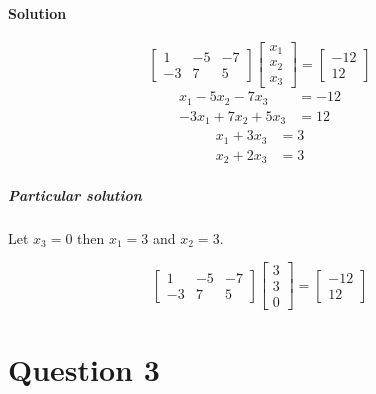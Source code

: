 \documentclass{article}
\begin{document}
\begin{enumerate}[label=(\alph*)]
                    \paragraph{Solution}
                        \[
                        \begin{bmatrix} 1 & -5 & -7 \\ -3 & 7 & 5 \end{bmatrix}
                        \begin{bmatrix}x_1\\x_2\\x_3\end{bmatrix}
                        =
                        \begin{bmatrix}-12\\12\end{bmatrix}
                        \]
                        \begin{align*}
                            x_1 - 5x_2 - 7x_3 &= -12 \\
                            -3x_1 + 7x_2 + 5x_3 &= 12
                        \end{align*}
                        \begin{align*}
                            x_1 + 3x_3 &= 3 \\
                            x_2 + 2x_3 &= 3
                        \end{align*}
                        \subparagraph{Particular solution}
                            Let $x_3=0$ then $x_1=3$ and $x_2=3$.
                        \begin{solutioncheck}
                            \[
                            \begin{bmatrix} 1 & -5 & -7 \\ -3 & 7 & 5 \end{bmatrix}
                            \begin{bmatrix}3\\3\\0\end{bmatrix}
                            =
                            \begin{bmatrix}-12\\12\end{bmatrix}
                            \]
                        \end{solutioncheck}
            \end{enumerate}   

    \section{Question 3}
\end{document}
